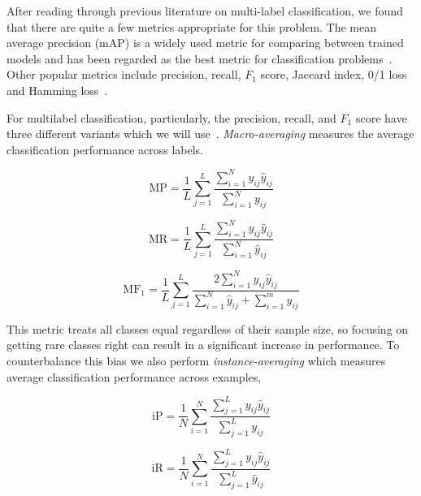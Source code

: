 \documentclass[12pt,journal,compsoc]{IEEEtran}
\begin{document}


After reading through previous literature on multi-label classification, we found that there are quite a few metrics appropriate for this problem. The mean average precision (mAP) is a widely used metric for comparing between trained models and has been regarded as the best metric for classification problems~\cite{Lavrenko_2014}.  Other popular metrics include precision, recall, $F_1$ score, Jaccard index, 0/1 loss and Hamming loss~\cite{Tsoumakas:2007,SOKOLOVA2009427,Herrera:2016}. 

For multilabel classification, particularly, the precision, recall, and $F_1$ score have three different variants which we will use~\cite{MADJAROV20123084,WuZ16,Koyejo:2015,GongJLTI13}. \textit{Macro-averaging} measures the average classification performance across labels.  

\begin{equation}
\mathrm{MP} = \frac{1}{L}\sum_{j=1}^{L}\frac{\sum_{i=1}^{N}y_{ij}\hat{y}_{ij}}{\sum_{i=1}^{N}y_{ij}}
\label{eq:MP}
\end{equation}

\begin{equation}
\mathrm{MR} = \frac{1}{L}\sum_{j=1}^{L}\frac{\sum_{i=1}^{N}y_{ij}\hat{y}_{ij}}{\sum_{i=1}^{N}\hat{y}_{ij}}
\label{eq:MR}
\end{equation}

\begin{equation}
\mathrm{MF_1} = \frac{1}{L}\sum_{j=1}^{L}\frac{2\sum_{i=1}^{N}y_{ij}\hat{y}_{ij}}{\sum_{i=1}^{N}\hat{y}_{ij}+\sum_{i=1}^{m}y_{ij}}
\label{eq:MF1}
\end{equation}

This metric treats all classes equal regardless of their sample size, so focusing on getting rare classes right can result in a significant increase in performance. To counterbalance this bias we also perform \textit{instance-averaging} which measures average classification performance across examples,

\begin{equation}
\mathrm{iP} = \frac{1}{N}\sum_{i=1}^{N}\frac{\sum_{j=1}^{L}y_{ij}\hat{y}_{ij}}{\sum_{j=1}^{L}y_{ij}}
\label{eq:iP}
\end{equation}

\begin{equation}
\mathrm{iR} = \frac{1}{N}\sum_{i=1}^{N}\frac{\sum_{j=1}^{L}y_{ij}\hat{y}_{ij}}{\sum_{j=1}^{L}\hat{y}_{ij}}
\label{eq:iR}
\end{equation}
\end{document}
